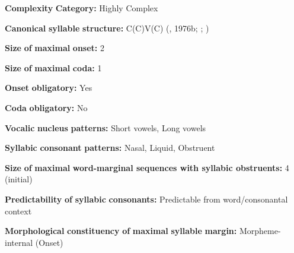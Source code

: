 \documentclass[output=paper]{langsci/langscibook}
\begin{document}
\begin{styleBody}
\textbf{Complexity} \textbf{Category:} Highly Complex 
\end{styleBody}

\begin{styleBody}
\textbf{Canonical} \textbf{syllable} \textbf{structure:} C(C)V(C) (\citealt{Diffloth1976a}, 1976b; \citealt{Sloan1988}; \citealt{Philips2007})
\end{styleBody}

\begin{styleBody}
\textbf{Size} \textbf{of} \textbf{maximal} \textbf{onset:} 2
\end{styleBody}

\begin{styleBody}
\textbf{Size} \textbf{of} \textbf{maximal} \textbf{coda:} 1
\end{styleBody}

\begin{styleBody}
\textbf{Onset} \textbf{obligatory:} Yes
\end{styleBody}

\begin{styleBody}
\textbf{Coda} \textbf{obligatory:} No
\end{styleBody}

\begin{styleBody}
\textbf{Vocalic} \textbf{nucleus} \textbf{patterns:} Short vowels, Long vowels
\end{styleBody}

\begin{styleBody}
\textbf{Syllabic} \textbf{consonant} \textbf{patterns:} Nasal, Liquid, Obstruent
\end{styleBody}

\begin{styleBody}
\textbf{Size} \textbf{of} \textbf{maximal} \textbf{word{}-marginal sequences with syllabic obstruents:} 4 (initial)
\end{styleBody}

\begin{styleBody}
\textbf{Predictability} \textbf{of} \textbf{syllabic} \textbf{consonants:} Predictable from word/consonantal context
\end{styleBody}

\begin{styleBody}
\textbf{Morphological} \textbf{constituency} \textbf{of} \textbf{maximal} \textbf{syllable} \textbf{margin:} Morpheme-internal (Onset)
\end{styleBody}
\end{document}
